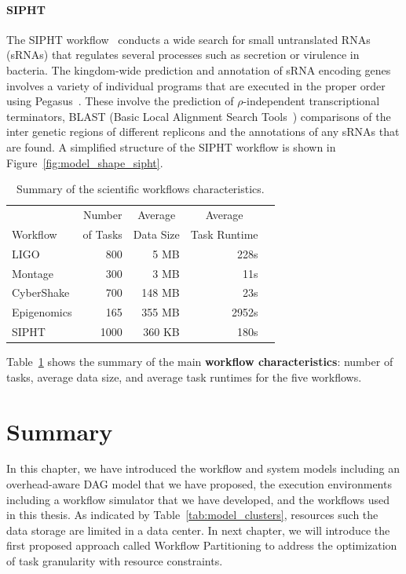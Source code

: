 \paragraph{\textbf{SIPHT}}
The SIPHT workflow~\cite{SIPHT} conducts a wide search for small untranslated RNAs (sRNAs) that regulates several processes such as secretion or virulence in bacteria. The kingdom-wide prediction and annotation of sRNA encoding genes involves a variety of individual programs that are executed in the proper order using Pegasus~\cite{Deelman2004}. These involve the prediction of $\rho$-independent transcriptional terminators, BLAST (Basic Local Alignment Search Tools~\cite{BLAST}) comparisons of the inter genetic regions of different replicons and the annotations of any sRNAs that are found. A simplified structure of the SIPHT workflow is shown in Figure~\ref{fig:model_shape_sipht}. 




\begin{table}[!htb]
	\setlength{\tabcolsep}{11pt}
	\centering
	\small
	\begin{tabular}{lrrrr}
		\hline
		 & \multicolumn{1}{c}{Number} & \multicolumn{1}{c}{Average} &  \multicolumn{1}{c}{Average} \\
		Workflow	& of Tasks	 & Data Size & Task Runtime \\
		\hline
		LIGO 		&800		& 5 MB	& 228s\\
		Montage 		&300		&3 MB	&11s\\
		CyberShake 	&700		&148 MB 	& 23s\\
		Epigenomics 	&165 	& 355 MB	& 2952s\\
		SIPHT		&1000	& 360 KB 	& 180s\\
		\hline
	\end{tabular}
	\caption{Summary of the scientific workflows characteristics.}
	\label{tab:model_workflows}
\end{table} 

Table~\ref{tab:model_workflows} shows the summary of the main \textbf{workflow characteristics}: number of tasks, average data size, and average task runtimes for the five workflows. 

\section{Summary}

In this chapter, we have introduced the workflow and system models including an overhead-aware DAG model that we have proposed, the execution environments including a workflow simulator that we have developed, and the workflows used in this thesis. As indicated by Table~\ref{tab:model_clusters}, resources such the data storage are limited in a data center. In next chapter, we will introduce the first proposed approach called Workflow Partitioning to address the optimization of task granularity with resource constraints. 
